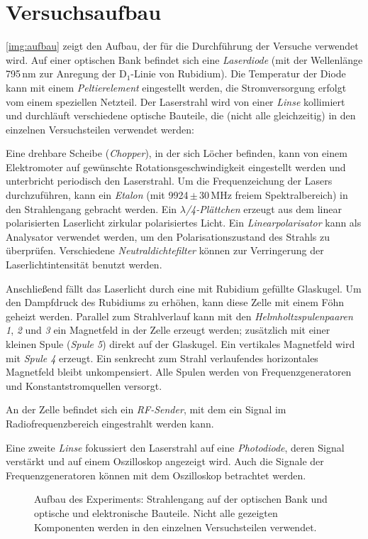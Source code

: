 \section{Versuchsaufbau}
\autoref{img:aufbau} zeigt den Aufbau, der für die Durchführung der Versuche
verwendet wird.
Auf einer optischen Bank befindet sich eine \emph{Laserdiode} (mit der Wellenlänge
795\,nm zur Anregung der D$_1$-Linie von Rubidium).
Die Temperatur der Diode kann mit einem \emph{Peltierelement} eingestellt werden,
die Stromversorgung erfolgt vom einem speziellen Netzteil.
Der Laserstrahl wird von einer \emph{Linse} kollimiert und durchläuft verschiedene
optische Bauteile, die (nicht alle gleichzeitig) in den einzelnen Versuchsteilen
verwendet werden:

Eine drehbare Scheibe (\emph{Chopper}), in der sich Löcher befinden, kann von
einem Elektromoter auf gewünschte Rotationsgeschwindigkeit eingestellt werden und unterbricht periodisch
den Laserstrahl.
Um die Fre\-quenz\-eich\-ung der Lasers durchzuführen, kann ein \emph{Etalon}
(mit 9924\,$\pm$\,30\,MHz freiem Spektralbereich) in den Strahlengang gebracht werden.
Ein \emph{$\lambda$/4-Plättchen} erzeugt aus dem linear polarisierten Laserlicht zirkular polarisiertes Licht.
Ein \emph{Linearpolarisator} kann als Analysator verwendet werden, um den Polarisationszustand
des Strahls zu überprüfen. Verschiedene \emph{Neutraldichtefilter} können zur Verringerung der Laserlichtintensität
benutzt werden.

Anschließend fällt das Laserlicht durch eine mit Rubidium gefüllte Glaskugel.
Um den Dampfdruck des Rubidiums zu erhöhen, kann diese Zelle mit einem Föhn geheizt werden.
Parallel zum Strahlverlauf kann mit den \emph{Helmholtzspulenpaaren 1}, \emph{2} und \emph{3}
ein Magnetfeld in der Zelle erzeugt werden;
zusätzlich mit einer kleinen Spule (\emph{Spule 5}) direkt auf der Glaskugel.
Ein vertikales Magnetfeld wird mit \emph{Spule 4} erzeugt.
Ein senkrecht zum Strahl verlaufendes horizontales Magnetfeld bleibt unkompensiert.
Alle Spulen werden von Frequenzgeneratoren und Konstantstromquellen versorgt.

An der Zelle befindet sich ein \emph{RF-Sender}, mit dem ein Signal im Radiofrequenzbereich eingestrahlt werden kann.

Eine zweite \emph{Linse} fokussiert den Laserstrahl auf eine \emph{Photodiode}, deren Signal verstärkt und auf
einem Oszilloskop angezeigt wird.
Auch die Signale der Frequenzgeneratoren können mit dem Oszilloskop betrachtet werden.


\begin{landscape}

\begin{figure}[H]
        \def\svgwidth{1.4\textwidth}
        
        \caption{Aufbau des Experiments: Strahlengang auf der optischen Bank
        und optische und elektronische Bauteile.
        Nicht alle gezeigten Komponenten werden in den einzelnen
        Versuchsteilen verwendet.}
        \label{img:aufbau}
\end{figure}

\end{landscape}
